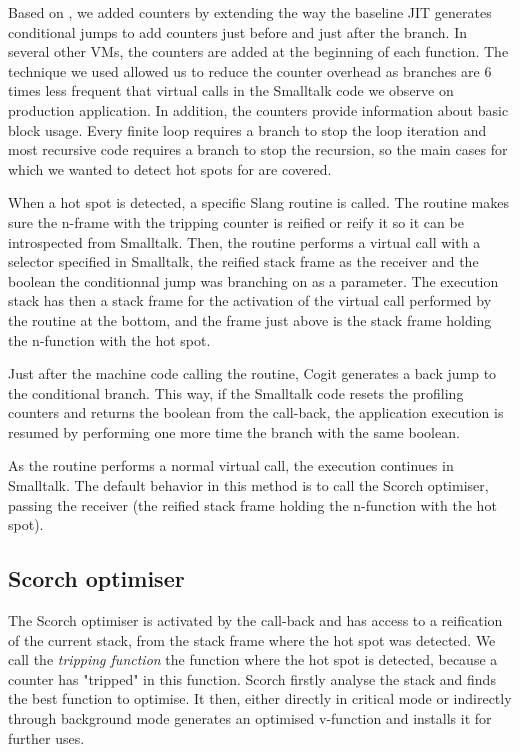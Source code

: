 \documentclass[a4paper,12pt,twoside]{../includes/ThesisStyle}
\begin{document}

Based on \cite{Arn02}, we added counters by extending the way the baseline JIT generates conditional jumps to add counters just before and just after the branch. In several other VMs, the counters are added at the beginning of each function. The technique we used allowed us to reduce the counter overhead as branches are 6 times less frequent that virtual calls in the Smalltalk code we observe on production application. In addition, the counters provide information about basic block usage. Every finite loop requires a branch to stop the loop iteration and most recursive code requires a branch to stop the recursion, so the main cases for which we wanted to detect hot spots for are covered.

When a hot spot is detected, a specific Slang routine is called. The routine makes sure the n-frame with the tripping counter is reified or reify it so it can be introspected from Smalltalk. Then, the routine performs a virtual call with a selector specified in Smalltalk, the reified stack frame as the receiver and the boolean the conditionnal jump was branching on as a parameter. The execution stack has then a stack frame for the activation of the virtual call performed by the routine at the bottom, and the frame just above is the stack frame holding the n-function with the hot spot.

Just after the machine code calling the routine, Cogit generates a back jump to the conditional branch. This way, if the Smalltalk code resets the profiling counters and returns the boolean from the call-back, the application execution is resumed by performing one more time the branch with the same boolean.


As the routine performs a normal virtual call, the execution continues in Smalltalk. The default behavior in this method is to call the Scorch optimiser, passing the receiver (the reified stack frame holding the n-function with the hot spot).

\subsection{Scorch optimiser}

The Scorch optimiser is activated by the call-back and has access to a reification of the current stack, from the stack frame where the hot spot was detected. We call the \emph{tripping function} the function where the hot spot is detected, because a counter has "tripped" in this function. Scorch firstly analyse the stack and finds the best function to optimise. It then, either directly in critical mode or indirectly through background mode generates an optimised v-function and installs it for further uses.
\end{document}
